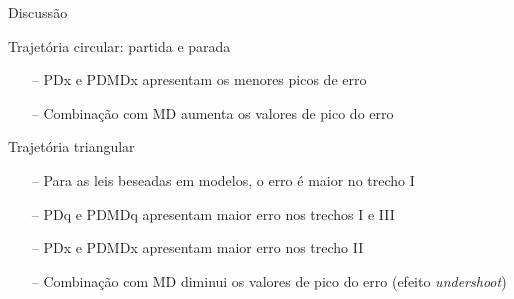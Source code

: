 \documentclass[25pt,landscape]{beamer}
\begin{document}
\begin{frame}{Discussão}
    \begin{block}{Trajetória circular: partida e parada}
        \begin{itemize}
            \item[--] PDx e PDMDx apresentam os menores picos de erro \\[5pt]
            \item[--] Combinação com MD aumenta os valores de pico do erro \\[5pt]
        \end{itemize}
    \end{block}
    \begin{block}{Trajetória triangular}
        \begin{itemize}
            \item[--] Para as leis beseadas em modelos, o erro é maior no trecho I \\[5pt]
            \item[--] PDq e PDMDq apresentam maior erro nos trechos I e III \\[5pt]
            \item[--] PDx e PDMDx apresentam maior erro nos trecho II \\[5pt]
            \item[--] Combinação com MD diminui os valores de pico do erro (efeito \emph{undershoot}) \\[5pt]
        \end{itemize}
    \end{block}
\end{frame}
\end{document}
